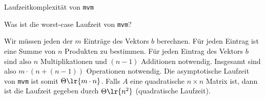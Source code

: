 \begin{frame}{Laufzeitkomplexität von \texttt{mvm}}
	\begin{myexercise}
		Was ist die worst-case Laufzeit von \texttt{mvm}?
	\end{myexercise}
\end{frame}

\begin{frame}
	\begin{myanswer}
		Wir müssen jeden der $m$ Einträge des Vektors $b$ berechnen. Für jeden Eintrag ist eine Summe von $n$ Produkten zu bestimmen. Für jeden Eintrag des Vektors $b$ sind also $n$ Multiplikationen und $(n-1)$ Additionen notwendig. Insgesamt sind also $m \cdot (n + (n-1))$ Operationen notwendig. Die asymptotische Laufzeit von \texttt{mvm} ist somit $\Theta\lr{m \cdot n}$. Falls $A$ eine quadratische $n\times n$ Matrix ist, dann ist die Laufzeit gegeben durch $\Theta\lr{n^2}$ (quadratische Laufzeit).
	\end{myanswer}
\end{frame}

